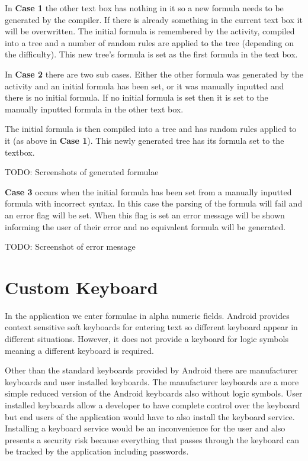 \documentclass{report}
\begin{document}
In \textbf{Case 1} the other text box has nothing in it so a new formula needs to be generated by the compiler. If there is already something in the current text box it will be overwritten. The initial formula is remembered by the activity, compiled into a tree and a number of random rules are applied to the tree (depending on the difficulty). This new tree's formula is set as the first formula in the text box.

In \textbf{Case 2} there are two sub cases. Either the other formula was generated by the activity and an initial formula has been set, or it was manually inputted and there is no initial formula. If no initial formula is set then it is set to the manually inputted formula in the other text box.

The initial formula is then compiled into a tree and has random rules applied to it (as above in \textbf{Case 1}). This newly generated tree has its formula set to the textbox.

TODO: Screenshots of generated formulae

\textbf{Case 3} occurs when the initial formula has been set from a manually inputted formula with incorrect syntax. In this case the parsing of the formula will fail and an error flag will be set. When this flag is set an error message will be shown informing the user of their error and no equivalent formula will be generated.

TODO: Screenshot of error message

\section{Custom Keyboard}
\label{sec:custom_keyboard}

In the application we enter formulae in alpha numeric fields. Android provides context sensitive soft keyboards for entering text so different keyboard appear in different situations. However, it does not provide a keyboard for logic symbols meaning a different keyboard is required.

Other than the standard keyboards provided by Android there are manufacturer keyboards and user installed keyboards. The manufacturer keyboards are a more simple reduced version of the Android keyboards also without logic symbols. User installed keyboards allow a developer to have complete control over the keyboard but end users of the application would have to also install the keyboard service. Installing a keyboard service would be an inconvenience for the user and also presents a security risk because everything that passes through the keyboard can be tracked by the application including passwords. 
\end{document}
